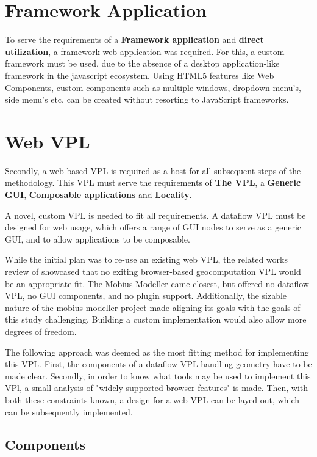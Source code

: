 \section{Framework Application}

To serve the requirements of a \textbf{Framework application} and \textbf{direct utilization}, a framework web application was required. 
For this, a custom framework must be used, due to the absence of a desktop application-like framework in the javascript ecosystem.
Using HTML5 features like Web Components, custom components such as multiple windows, dropdown menu's, side menu's etc. can be created without resorting to JavaScript frameworks.


\section{Web VPL} 
\label{sec:method:base-vpl}

Secondly, a web-based VPL is required as a host for all subsequent steps of the methodology. 
This VPL must serve the requirements of \textbf{The VPL}, a \textbf{Generic GUI}, \textbf{Composable applications} and \textbf{Locality}.

A novel, custom VPL is needed to fit all requirements. 
A dataflow VPL must be designed for web usage, which offers a range of \ac{GUI} nodes to serve as a generic GUI, and to allow applications to be composable. 

While the initial plan was to re-use an existing web VPL, the related works review of  showcased that no exiting browser-based geocomputation VPL would be an appropriate fit.
The Mobius Modeller \citep{janssen_mobius_2021} came closest, but offered no dataflow VPL, no GUI components, and no plugin support. 
Additionally, the sizable nature of the mobius modeller project made aligning its goals with the goals of this study challenging. 
Building a custom implementation would also allow more degrees of freedom.

The following approach was deemed as the most fitting method for implementing this VPL. 
First, the components of a dataflow-VPL handling geometry have to be made clear.
Secondly, in order to know what tools may be used to implement this VPl, a small analysis of "widely supported browser features" is made. 
Then, with both these constraints known, a design for a web VPL can be layed out, which can be subsequently implemented. 

\subsection{Components}

